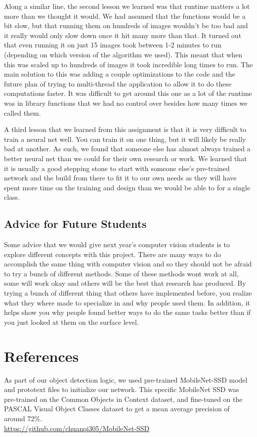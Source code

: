 \documentclass[12pt]{article}
\begin{document}
	Along a similar line, the second lesson we learned was that runtime matters a lot more than we thought it would. We had assumed that the functions would be a bit slow, but that running them on hundreds of images wouldn't be too bad and it really would only slow down once it hit many more than that. It turned out that even running it on just 15 images took between 1-2 minutes to run (depending on which version of the algorithm we used). This meant that when this was scaled up to hundreds of images it took incredible long times to run. The main solution to this was adding a couple optimizations to the code and the future plan of trying to multi-thread the application to allow it to do these computations faster. It was difficult to get around this one as a lot of the runtime was in library functions that we had no control over besides how many times we called them.
	
	A third lesson that we learned from this assignment is that it is very difficult to train a neural net well. You can train it on one thing, but it will likely be really bad at another. As such, we found that someone else has almost always trained a better neural net than we could for their own research or work. We learned that it is usually a good stepping stone to start with someone else's pre-trained network and the build from there to fit it to our own needs as they will have spent more time on the training and design than we would be able to for a single class.

\subsection{Advice for Future Students}
	Some advice that we would give next year's computer vision students is to explore different concepts with this project. There are many ways to do accomplish the same thing with computer vision and so they should not be afraid to try a bunch of different methods. Some of these methods wont work at all, some will work okay and others will be the best that research has produced. By trying a bunch of different thing that others have implemented before, you realize what they where made to specialize in and why people used them. In addition, it helps show you why people found better ways to do the same tasks better than if you just looked at them on the surface level.


\section*{References}
	As part of our object detection logic, we used pre-trained MobileNet-SSD model and prototext files to initialize our network. This specific MobileNet SSD was pre-trained on the Common Objects in Context dataset, and fine-tuned on the PASCAL Visual Object Classes dataset to get a mean average precision of around 72\%. \\
	\url{https://github.com/chuanqi305/MobileNet-SSD}
	
\end{document}
